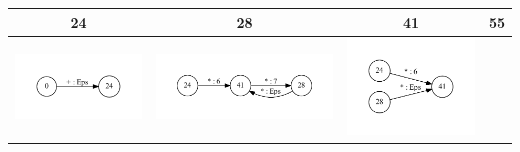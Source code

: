 \begin{table}[h]
  \centering
  \begin{tabular}{ | c | c | c | c | }
    \hline
    24 & 28 & 41 & 55 \\ \hline
    \begin{minipage}{.22\textwidth}
      \includegraphics[width=\linewidth]{Polubelova/24_inv}
    \end{minipage}
    &
    \begin{minipage}{.22\textwidth}
      \includegraphics[width=\linewidth]{Polubelova/28_inv}
    \end{minipage}
    & 
    \begin{minipage}{.22\textwidth}
      \includegraphics[width=\linewidth]{Polubelova/41_inv}

\end{minipage}
\end{tabular}
\end{table}
